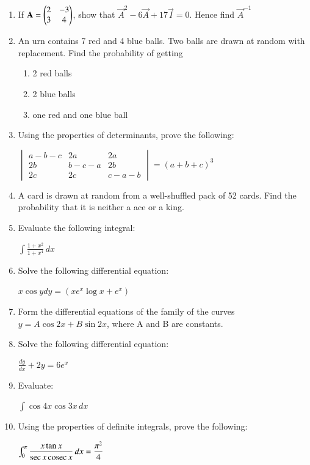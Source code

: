 \documentclass[journal,12pt,twocolumn]{IEEEtran}
\begin{document}
\begin{enumerate}
\item If $\mathbf{A} =\begin{pmatrix}2&-3\\3&4\end{pmatrix}$, show that $\vec{A}^2 - 6\vec{A} + 17\vec{I} = 0$. Hence find $\vec{A}^{-1}$
\item An urn contains 7 red and 4 blue balls. Two balls are drawn at random with replacement. Find the probability of getting
\begin{enumerate}
\item 2 red balls
\item 2 blue balls
\item one red and one blue ball
\end{enumerate} 
\item Using the properties of determinants, prove the following:
\begin{center}
$\begin{vmatrix}
a-b-c & 2a& 2a\\ 2b& b-c-a& 2b\\2c&2c&c-a-b 
\end{vmatrix}
= (a+b+c)^3$
\end{center}
\item A card is drawn at random from a well-shuffled pack of 52 cards. Find the probability that it is neither a ace or a king.
\item Evaluate the following integral:
\begin{center}
$ \int \displaystyle\frac{1+x^2}{1+x^4}\,dx $
\end{center}
\item Solve the following differential equation:
\begin{center}
$x \cos y dy=(xe^x\log x + e^x)$
\end{center}
\item Form the differential equations of the family of the curves $y = A\cos 2x + B\sin 2x$, where A and B are constants.
\item Solve the following differential equation:
\begin{center}
   $ \displaystyle\frac{dy}{dx} + 2y = 6e^x $
\end{center}
\item Evaluate:
\begin{center}
  $ \int \cos 4x\cos 3x\, dx $
\end{center}
\item Using the properties of definite integrals, prove the following:
\begin{center}
 $ \int_{0}^{\pi} \displaystyle\frac{x\tan x}{\sec x\,\text{cosec}\, x}\, dx = \displaystyle\frac{\pi^2}{4} $

\end{center}
\end{enumerate}
\end{document}
